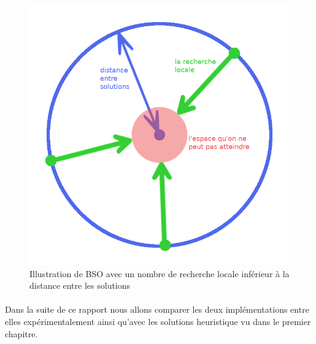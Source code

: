 	\begin{figure}[H]\label{localeSearch2}
		\centering
		\includegraphics[scale=0.35]{images/imgs/localeSearch.png}
		\caption{Illustration de BSO avec un nombre de recherche locale inférieur à la distance entre les solutions}
	\end{figure}
	\paragraph{}
	Dans la suite de ce rapport nous allons comparer les deux implémentations entre elles expérimentalement ainsi qu’avec les solutions heuristique vu dans le premier chapitre. 

